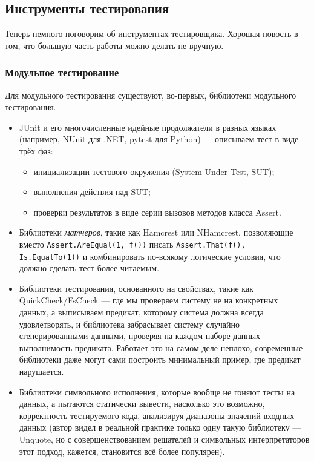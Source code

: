 \documentclass{../../text-style}
\begin{document}
\subsection{Инструменты тестирования}

Теперь немного поговорим об инструментах тестировщика. Хорошая новость в том, что большую часть работы можно делать не вручную.

\subsubsection{Модульное тестирование}

Для модульного тестирования существуют, во-первых, библиотеки модульного тестирования.

\begin{itemize}
    \item JUnit и его многочисленные идейные продолжатели в разных языках (например, NUnit для .NET, pytest для Python) --- описываем тест в виде трёх фаз:
    \begin{itemize}
        \item инициализации тестового окружения (System Under Test, SUT);
        \item выполнения действия над SUT;
        \item проверки результатов в виде серии вызовов методов класса Assert.
    \end{itemize}
    \item Библиотеки \emph{матчеров}, такие как Hamcrest или NHamcrest, позволяющие вместо \texttt{Assert.AreEqual(1, f())} писать \texttt{Assert.That(f(), Is.EqualTo(1))} и комбинировать по-всякому логические условия, что должно сделать тест более читаемым.
    \item Библиотеки тестирования, основанного на свойствах, такие как QuickCheck/FsCheck --- где мы проверяем систему не на конкретных данных, а выписываем предикат, которому система должна всегда удовлетворять, и библиотека забрасывает систему случайно сгенерированными данными, проверяя на каждом наборе данных выполнимость предиката. Работает это на самом деле неплохо, современные библиотеки даже могут сами построить минимальный пример, где предикат нарушается.
    \item Библиотеки символьного исполнения, которые вообще не гоняют тесты на данных, а пытаются статически вывести, насколько это возможно, корректность тестируемого кода, анализируя диапазоны значений входных данных (автор видел в реальной практике только одну такую библиотеку --- Unquote, но с совершенствованием решателей и символьных интерпретаторов этот подход, кажется, становится всё более популярен).
\end{itemize}
\end{document}
